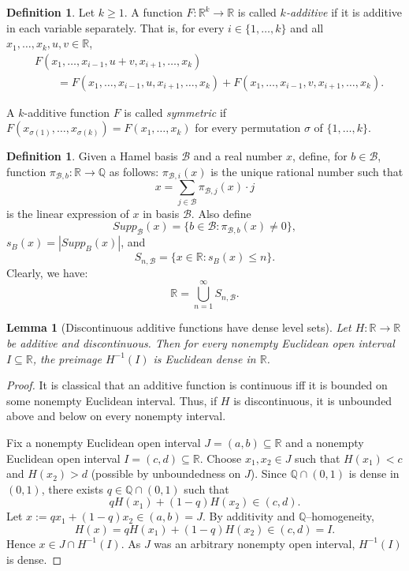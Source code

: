 \documentclass[11pt]{amsart} %
\newtheorem{lemma}[theorem]{Lemma}
\theoremstyle{definition}
\newtheorem{definition}[theorem]{Definition}
\newcommand{\B}{\mathcal{B}}
\newcommand{\R}{\mathbb{R}}
\newcommand{\Q}{\mathbb{Q}}
\begin{document}
\begin{definition}
Let $k\geq 1$. A function $
F\colon \mathbb{R}^k\to\mathbb{R}$ 
is called \emph{$k$-additive} if it is additive in each variable separately.
That is, for every $i\in\{1,\ldots,k\}$ and all
$x_1,\ldots,x_k,u,v\in\mathbb{R}$,
\[
\begin{aligned}
&F(x_1,\ldots,x_{i-1},u+v,x_{i+1},\ldots,x_k)\\
&\qquad =
F(x_1,\ldots,x_{i-1},u,x_{i+1},\ldots,x_k)
+
F(x_1,\ldots,x_{i-1},v,x_{i+1},\ldots,x_k).
\end{aligned}
\]

A $k$-additive function $F$ is called \emph{symmetric} if
$
F(x_{\sigma(1)},\ldots,x_{\sigma(k)})
=
F(x_1,\ldots,x_k)$ 
for every permutation $\sigma$ of $\{1,\ldots,k\}$.
\end{definition}
\begin{definition} 
Given a Hamel basis $\B$ and a real number $x$, define, for $b\in \B$, function $\pi_{\B,b}: \R\rightarrow \Q$ as follows: $\pi_{\B,i}(x)$ is the unique rational number such that 
\begin{equation} 
x= \sum_{j\in \B}\pi_{\B,j}(x)\cdot j 
\end{equation} 
is the linear expression of $x$ in basis $\B$. Also define 
\begin{equation} 
Supp_{\B}(x)=\{b\in \B: \pi_{\B,b}(x)\neq 0\}, 
\end{equation} 
$s_{B}(x)=|Supp_{B}(x)|$, and 
\begin{equation} 
S_{n,\B}=\{x\in \R: s_{B}(x)\leq n\}. 
\label{eq:sn}
\end{equation} 
Clearly, we have:
\begin{equation} 
\mathbb{R}=\bigcup_{n=1}^{\infty}S_{n,\B}. 
\end{equation} 
\end{definition} 

\iffalse
\begin{lemma}[Discontinuous additive functions have dense level sets]\label{lem:additive-dense-preimage}
Let $H:\R\to\R$ be additive and discontinuous. Then for every nonempty Euclidean open interval $I\subseteq\R$,
the preimage $H^{-1}(I)$ is Euclidean dense in $\R$.
\end{lemma}

\begin{proof}
It is classical that an additive function is continuous iff it is bounded on some nonempty Euclidean interval.
Thus, if $H$ is discontinuous, it is unbounded above and below on every nonempty interval.

Fix a nonempty Euclidean open interval $J=(a,b)\subseteq\R$ and a nonempty Euclidean open interval $I=(c,d)\subseteq\R$.
Choose $x_1,x_2\in J$ such that $H(x_1)<c$ and $H(x_2)>d$ (possible by unboundedness on $J$).
Since $\Q\cap(0,1)$ is dense in $(0,1)$, there exists $q\in\Q\cap(0,1)$ such that
\[
qH(x_1)+(1-q)H(x_2)\in (c,d).
\]
Let $x:=q x_1+(1-q)x_2\in (a,b)=J$. By additivity and $\Q$--homogeneity,
\[
H(x)=qH(x_1)+(1-q)H(x_2)\in (c,d)=I.
\]
Hence $x\in J\cap H^{-1}(I)$. As $J$ was an arbitrary nonempty open interval, $H^{-1}(I)$ is dense.
\end{proof}
\end{document}
